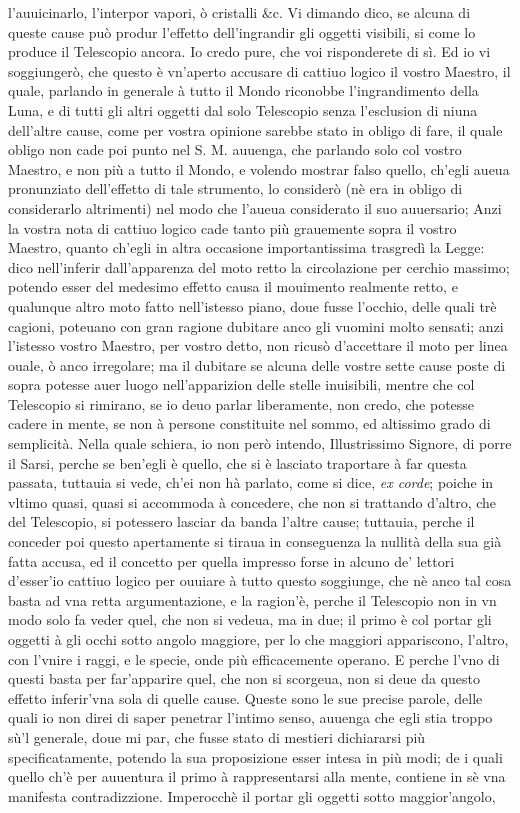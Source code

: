 \documentclass[11pt,twoside,openany]{book}
\begin{document}
l'auuicinarlo, l'interpor vapori, ò cristalli \&c. Vi dimando dico, se alcuna di queste cause può produr l'effetto dell'ingrandir gli oggetti visibili, si come lo produce il Telescopio ancora. Io credo pure, che voi risponderete di sì. Ed io vi soggiungerò, che questo è vn'aperto accusare di cattiuo logico il vostro Maestro, il quale, parlando in generale à tutto il Mondo riconobbe l'ingrandimento della Luna, e di tutti gli altri oggetti dal solo Telescopio senza l'esclusion di niuna dell'altre cause, come per vostra opinione sarebbe stato in obligo di fare, il quale obligo non cade poi punto nel S. M. auuenga, che parlando solo col vostro Maestro, e non più a tutto il Mondo, e volendo mostrar falso quello, ch'egli aueua pronunziato dell'effetto di tale strumento, lo considerò (nè era in obligo di considerarlo altrimenti) nel modo che l'aueua considerato il suo auuersario; Anzi la vostra nota di cattiuo logico cade tanto più grauemente sopra il vostro Maestro, quanto ch'egli in altra occasione importantissima trasgredì la Legge: dico nell'inferir dall'apparenza del moto retto la circolazione per cerchio massimo; potendo esser del medesimo effetto causa il mouimento realmente retto, e qualunque altro moto fatto nell'istesso piano, doue fusse l'occhio, delle quali trè cagioni, poteuano con gran ragione dubitare anco gli vuomini molto sensati; anzi l'istesso vostro Maestro, per vostro detto, non ricusò d'accettare il moto per linea ouale, ò anco irregolare; ma il dubitare se alcuna delle vostre sette cause poste di sopra potesse auer luogo nell'apparizion delle stelle inuisibili, mentre che col Telescopio si rimirano, se io deuo parlar liberamente, non credo, che potesse cadere in mente, se non à persone constituite nel sommo, ed altissimo grado di semplicità. Nella quale schiera, io non però intendo, Illustrissimo Signore, di porre il Sarsi, perche se ben'egli è quello, che si è lasciato traportare à far questa passata, tuttauia si vede, ch'ei non hà parlato, come si dice, \textit{ex corde}; poiche in vltimo quasi, quasi si accommoda à concedere, che non si trattando d'altro, che del Telescopio, si potessero lasciar da banda l'altre cause; tuttauia, perche il conceder poi questo apertamente si tiraua in conseguenza la nullità della sua già fatta accusa, ed il concetto per quella impresso forse in alcuno de' lettori d'esser'io cattiuo logico per ouuiare à tutto questo soggiunge, che nè anco tal cosa basta ad vna retta argumentazione, e la ragion'è, perche il Telescopio non in vn modo solo fa veder quel, che non si vedeua, ma in due; il primo è col portar gli oggetti à gli occhi sotto angolo maggiore, per lo che maggiori appariscono, l'altro, con l'vnire i raggi, e le specie, onde più efficacemente operano. E perche l'vno di questi basta per far'apparire quel, che non si scorgeua, non si deue da questo effetto inferir'vna sola di quelle cause. Queste sono le sue precise parole, delle quali io non direi di saper penetrar l'intimo senso, auuenga che egli stia troppo sù'l generale, doue mi par, che fusse stato di mestieri dichiararsi più specificatamente, potendo la sua proposizione esser intesa in più modi; de i quali quello ch'è per auuentura il primo à rappresentarsi alla mente, contiene in sè vna manifesta contradizzione. Imperocchè il portar gli oggetti sotto maggior'angolo, 
\end{document}
